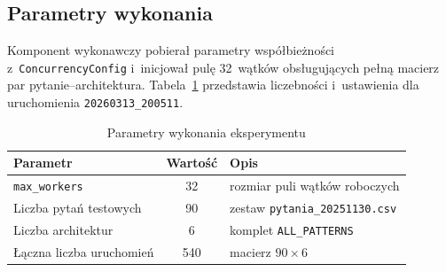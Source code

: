   \subsection{Parametry wykonania}\label{subsec:parametry-wykonania}

  Komponent wykonawczy pobierał parametry współbieżności
  z~\texttt{ConcurrencyConfig} i~inicjował pulę 32~wątków obsługujących pełną
  macierz par pytanie--architektura. Tabela~\ref{tab:parametry-wykonania}
  przedstawia liczebności i~ustawienia dla uruchomienia \texttt{20260313\_200511}.

  \begin{table}[H]
    \caption{Parametry wykonania eksperymentu}\label{tab:parametry-wykonania}
    \centering
    \small
    \renewcommand{\arraystretch}{1.3}
    \begin{tabular}{@{} l c l @{}}
      \toprule
      \textbf{Parametr}
      & \textbf{Wartość}
      & \textbf{Opis}                                            \\
      \midrule
      \texttt{max\_workers}    & 32               & rozmiar puli wątków roboczych         \\
      Liczba pytań testowych   & 90               & zestaw \texttt{pytania\_20251130.csv} \\
      Liczba architektur       & 6                & komplet \texttt{ALL\_PATTERNS}        \\
      Łączna liczba uruchomień & 540              & macierz \(90 \times 6\)               \\
      \bottomrule
    \end{tabular}
  \end{table}